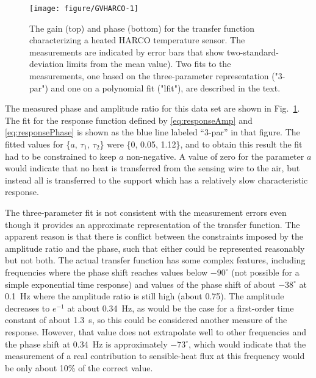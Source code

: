 \documentclass[11pt,twoside,american,12pt,twoside,american]{article}\usepackage[]{graphicx}\usepackage[]{color}
\makeatletter
\def\maxwidth{ %
  \ifdim\Gin@nat@width>\linewidth
    \linewidth
  \else
    \Gin@nat@width
  \fi
}
\newenvironment{knitrout}{}{} %
\makeatother
\begin{document}
\begin{knitrout}
\color{fgcolor}\begin{figure}

{\centering \texttt{[image: figure/GVHARCO-1]} 

}

\caption[The gain (top) and phase (bottom) for the transfer function characterizing a heated HARCO temperature sensor]{The gain (top) and phase (bottom) for the transfer function characterizing a heated HARCO temperature sensor. The measurements are indicated by error bars that show two-standard-deviation limits from the mean value). Two fits to the measurements, one based on the three-parameter representation ("3-par") and one on a polynomial fit ("lfit"), are described in the text.}\label{fig:GVHARCO}
\end{figure}


\end{knitrout}

The measured phase and amplitude ratio for this data set are shown
in Fig.~\ref{fig:GVHARCO}. The fit for the response function defined
by \eqref{eq:responseAmp} and \eqref{eq:responsePhase} is shown
as the blue line labeled ``3-par'' in that figure. The fitted values
for \{$a,\,\tau_{1},\,\tau_{2}$\} were \{0, 0.05,
1.12\}, and to obtain this result the fit
had to be constrained to keep $a$ non-negative. A value of zero for
the parameter $a$ would indicate that no heat is transferred from
the sensing wire to the air, but instead all is transferred to the
support which has a relatively slow characteristic response. 

The three-parameter fit is not consistent with the measurement errors
even though it provides an approximate representation of the transfer
function. The apparent reason is that there is conflict between the
constraints imposed by the amplitude ratio and the phase, such that
either could be represented reasonably but not both. The actual transfer
function has some complex features, including frequencies where the
phase shift reaches values below $-90^{\circ}$ (not possible for
a simple exponential time response) and values of the phase shift
of about $-38^{\circ}$ at 0.1~Hz where the amplitude ratio is still
high (about 0.75). The amplitude decreases to $e^{-1}$ at about 0.34~Hz,
as would be the case for a first-order time constant of about 1.3~s,
so this could be considered another measure of the response. However,
that value does not extrapolate well to other frequencies and the
phase shift at 0.34~Hz is approximately $-73^{\circ}$, which would
indicate that the measurement of a real contribution to sensible-heat
flux at this frequency would be only about 10\% of the correct value.
\end{document}
